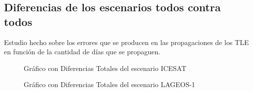\subsection*{Diferencias de los escenarios todos contra todos}
Estudio hecho sobre los errores que se producen en las propagaciones de los TLE en funci\'on de la cantidad de d\'ias que se propaguen.\\

\begin{figure}[h!]
\centering
  \caption{Gr\'afico con Diferencias Totales del escenario ICESAT}
  \label{fig:icesatTot}
\end{figure}

\begin{figure}[h!]
\centering
  \caption{Gr\'afico con Diferencias Totales del escenario LAGEOS-1}
  \label{fig:lageosTot}
\end{figure}


